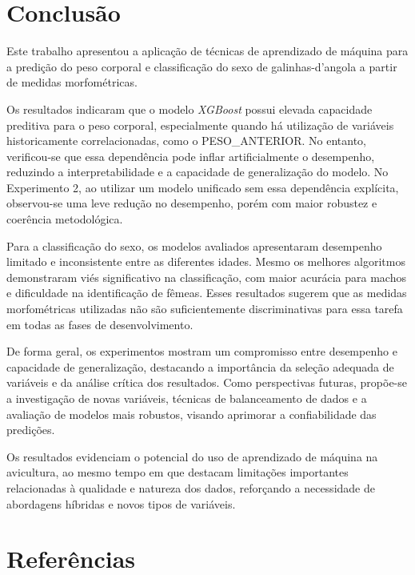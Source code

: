 \documentclass[12pt]{article}
\begin{document}
\section{Conclusão}

Este trabalho apresentou a aplicação de técnicas de aprendizado de máquina para
a predição do peso corporal e classificação do sexo de galinhas-d'angola a
partir de medidas morfométricas.

Os resultados indicaram que o modelo \textit{XGBoost} possui elevada capacidade
preditiva para o peso corporal, especialmente quando há utilização de variáveis
historicamente correlacionadas, como o PESO\_ANTERIOR. No entanto, verificou-se
que essa dependência pode inflar artificialmente o desempenho, reduzindo a
interpretabilidade e a capacidade de generalização do modelo. No Experimento 2, ao
utilizar um modelo unificado sem essa dependência explícita, observou-se uma
leve redução no desempenho, porém com maior robustez e coerência metodológica.

Para a classificação do sexo, os modelos avaliados apresentaram desempenho
limitado e inconsistente entre as diferentes idades. Mesmo os melhores
algoritmos demonstraram viés significativo na classificação, com maior acurácia
para machos e dificuldade na identificação de fêmeas. Esses resultados sugerem
que as medidas morfométricas utilizadas não são suficientemente discriminativas
para essa tarefa em todas as fases de desenvolvimento.

De forma geral, os experimentos mostram um compromisso entre desempenho e
capacidade de generalização, destacando a importância da seleção adequada de
variáveis e da análise crítica dos resultados. Como perspectivas futuras,
propõe-se a investigação de novas variáveis, técnicas de balanceamento de dados
e a avaliação de modelos mais robustos, visando aprimorar a confiabilidade das
predições.

Os resultados evidenciam o potencial do uso de aprendizado de máquina na
avicultura, ao mesmo tempo em que destacam limitações importantes relacionadas
à qualidade e natureza dos dados, reforçando a necessidade de abordagens
híbridas e novos tipos de variáveis.

\section*{Referências}
\nocite{*}


\end{document}
